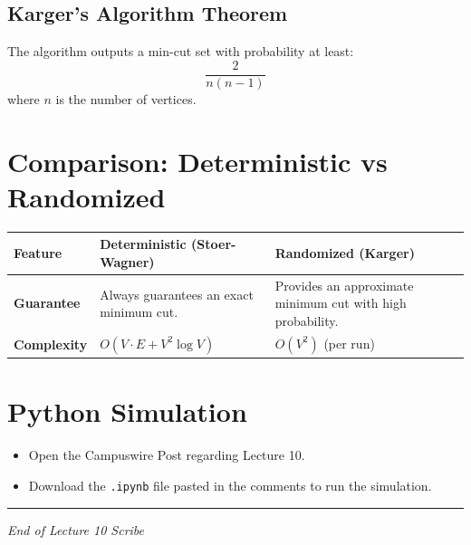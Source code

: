 \documentclass[11pt]{article}
\begin{document}
\subsection{Karger's Algorithm Theorem}
The algorithm outputs a min-cut set with probability at least:
\[ \frac{2}{n(n-1)} \]
where $n$ is the number of vertices.

\section{Comparison: Deterministic vs Randomized}

\begin{table}[h]
\centering
\begin{tabular}{|l|p{6cm}|p{6cm}|}
\hline
\textbf{Feature} & \textbf{Deterministic (Stoer-Wagner)} & \textbf{Randomized (Karger)} \\
\hline
\textbf{Guarantee} & Always guarantees an exact minimum cut. & Provides an approximate minimum cut with high probability. \\
\hline
\textbf{Complexity} & $O(V \cdot E + V^2 \log V)$ & $O(V^2)$ (per run) \\
\hline
\end{tabular}
\end{table}

\section{Python Simulation}
\begin{itemize}
    \item Open the Campuswire Post regarding Lecture 10.
    \item Download the \texttt{.ipynb} file pasted in the comments to run the simulation.
\end{itemize}

\bigskip
\hrule
\vspace{0.2cm}
\begin{center}
    \small \textit{End of Lecture 10 Scribe}
\end{center}
\end{document}

